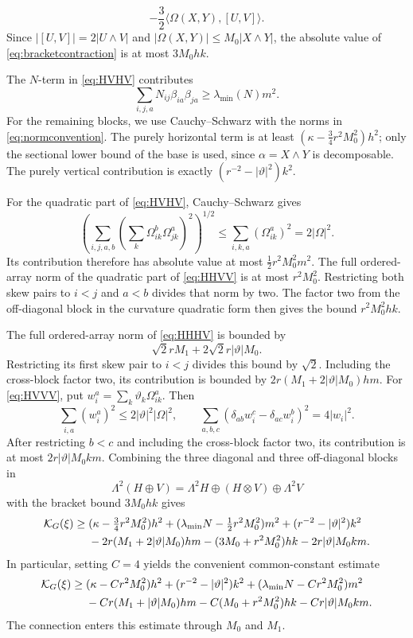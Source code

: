\documentclass[12pt]{amsart}
\numberwithin{equation}{section}
\theoremstyle{remark}
\newcommand{\cK}{\mathcal K}
\begin{document}
\begin{equation}\label{eq:bracketcontraction}
-\frac32\langle\Omega(X,Y),[U,V]\rangle.
\end{equation}
Since \(|[U,V]|=2|U\wedge V|\) and
\(|\Omega(X,Y)|\le M_0|X\wedge Y|\), the absolute value of
\eqref{eq:bracketcontraction} is at most \(3M_0hk\).

The \(N\)-term in \eqref{eq:HVHV} contributes
\[
\sum_{i,j,a}N_{ij}\beta_{ia}\beta_{ja}
       \ge\lambda_{\min}(N)m^2.
\]
For the remaining blocks, we use Cauchy--Schwarz with the norms
in \eqref{eq:normconvention}. The purely horizontal term is at least
\((\kappa-\tfrac34r^2M_0^2)h^2\); only the sectional lower bound of
the base is used, since \(\alpha=X\wedge Y\) is decomposable.
The purely vertical contribution is exactly
\((r^{-2}-|\vartheta|^2)k^2\).

For the quadratic part of \eqref{eq:HVHV}, Cauchy--Schwarz gives
\[
 \left(\sum_{i,j,a,b}
   \left(\sum_k\Omega_{ik}^b\Omega_{jk}^a\right)^2\right)^{1/2}
 \le\sum_{i,k,a}(\Omega_{ik}^a)^2=2|\Omega|^2.
\]
Its contribution therefore has absolute value at most
\(\tfrac12r^2M_0^2m^2\). The full ordered-array norm of the quadratic
part of \eqref{eq:HHVV} is at most \(r^2M_0^2\). Restricting both
skew pairs to \(i<j\) and \(a<b\) divides that norm by two. The
factor two from the off-diagonal block in the curvature quadratic
form then gives the bound \(r^2M_0^2hk\).

The full ordered-array norm of \eqref{eq:HHHV} is bounded by
\[
 \sqrt2rM_1+2\sqrt2r|\vartheta|M_0.
\]
Restricting its first skew pair to \(i<j\) divides this bound by
\(\sqrt2\). Including the cross-block factor two, its contribution
is bounded by \(2r(M_1+2|\vartheta|M_0)hm\).
For \eqref{eq:HVVV}, put \(w_i^a=\sum_k\vartheta_k\Omega_{ik}^a\).
Then
\[
 \sum_{i,a}(w_i^a)^2\le2|\vartheta|^2|\Omega|^2,
 \qquad
 \sum_{a,b,c}(\delta_{ab}w_i^c-\delta_{ac}w_i^b)^2=4|w_i|^2.
\]
After restricting \(b<c\) and including the cross-block factor two,
its contribution is at most \(2r|\vartheta|M_0km\).
Combining the three diagonal and three off-diagonal blocks in
\[
 \Lambda^2(H\oplus V)=\Lambda^2H\oplus(H\otimes V)\oplus\Lambda^2V
\]
with the bracket bound \(3M_0hk\) gives
\begin{align}
 \cK_G(\xi)\ge{}&
  (\kappa-\tfrac34r^2M_0^2)h^2
  +(\lambda_{\min}N-\tfrac12r^2M_0^2)m^2
  +(r^{-2}-|\vartheta|^2)k^2\notag\\
 &-2r(M_1+2|\vartheta|M_0)hm
   -(3M_0+r^2M_0^2)hk-2r|\vartheta|M_0km.
 \label{eq:sharp-master}
\end{align}
In particular, setting \(C=4\) yields the convenient common-constant
estimate
\begin{align}
\cK_G(\xi)\ge{}&
(\kappa-Cr^2M_0^2)h^2+(r^{-2}-|\vartheta|^2)k^2
 +(\lambda_{\min}N-Cr^2M_0^2)m^2\notag\\
&-Cr(M_1+|\vartheta|M_0)hm
 -C(M_0+r^2M_0^2)hk-Cr|\vartheta|M_0km.
\label{eq:master}
\end{align}
The connection enters this estimate through \(M_0\) and \(M_1\).
\end{document}
